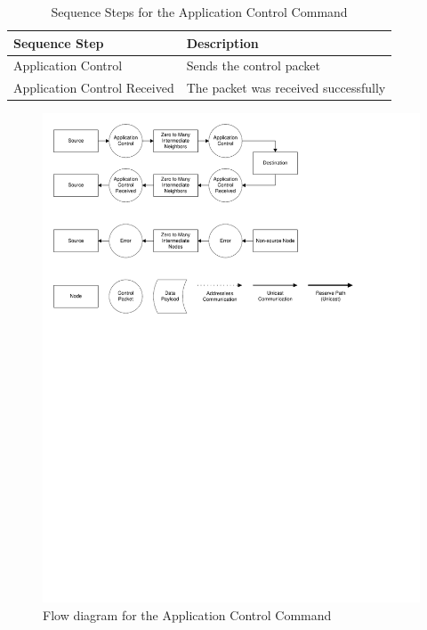 \begin{table}
	\begin{center}
		\setlength{\extrarowheight}{1.5pt}
		\caption{Sequence Steps for the Application Control Command}
		\vspace{0.1cm}
		\begin{tabular} {|l|l|}
			\hline
			\textbf{Sequence Step} & \textbf{Description} \\
			\hline
			\hline
			Application Control & Sends the control packet \\
			\hline
			Application Control Received & The packet was received successfully \\
			\hline
		\end{tabular}
		\label{tab:protocol:application_control}
	\end{center}
\end{table}

\begin{figure}[ptb]
	\begin{centering}
		\includegraphics[scale=0.75]{Protocol/Figures/protocol-application_control.pdf}
		\caption{Flow diagram for the Application Control Command}
		\label{fig:protocol:application_control}
	\end{centering}
\end{figure}

